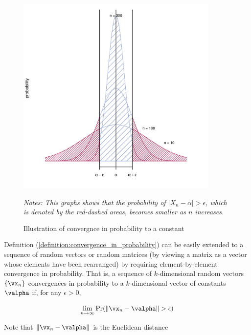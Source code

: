 \documentclass[english,12pt]{book}\usepackage[]{graphicx}\usepackage[]{xcolor}
\newenvironment{knitrout}{}{} %
\begin{document}
\begin{figure}[ht]
  \caption{Illustration of convergnce in probability to a constant}
    \label{fig:convinprob}
    \centering
    \begin{minipage}{.9\linewidth}
\begin{knitrout}
\color{fgcolor}

{\centering \includegraphics[width=10cm,height=10cm]{figure/convinprob-1} 

}


\end{knitrout}
\footnotesize
		\emph{Notes: This graphs shows that the probability of $\left|X_n-\alpha\right|>\epsilon$, which is denoted by the red-dashed areas, becomes smaller as $n$ increases. }
	\end{minipage}
\end{figure}

Definition (\ref{definition:convergence_in_probability}) can be easily extended to a sequence of random vectors or random matrices (by viewing a matrix as a vector whose elements have been rearranged) by requiring element-by-element convergence in probability. That is, a sequence of $k$-dimensional random vectors $\left\{\vx_n\right\}$ convergences in probability to a $k$-dimensional vector of constants $\valpha$ if, for any $\epsilon>0$,

\begin{equation*}
\lim_{n\to \infty} \Pr(\left\lVert\vx_{n}-\valpha\right\rVert>\epsilon)
\end{equation*}

Note that $\left\| \vx_n - \valpha\right\| $ is the Euclidean distance 
\end{document}
